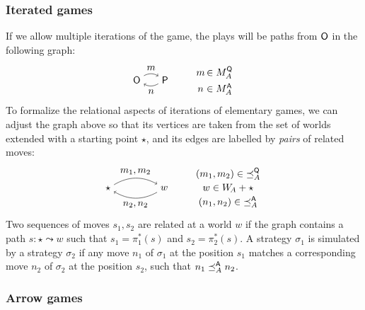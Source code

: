 \subsubsection{Iterated games}

If we allow multiple iterations of the game,
the plays will be paths from $ \mathsf{O} $ in the following graph:
\[
  \begin{tikzpicture}[baseline=(O.base)]
    \node (O) at (0,0) {\kw{O}};
    \node (P) at (1,0) {\kw{P}};
    \path [->] (O) edge[bend left] node[auto] {$m$} (P);
    \path [->] (P) edge[bend left] node[auto] {$n$} (O);
  \end{tikzpicture}
  \qquad
  \begin{array}{c@{\,}l}
    m &\in M_A^\kw{Q} \\[1ex]
    n &\in M_A^\kw{A}
  \end{array}
\]
To formalize the relational aspects of iterations
of elementary games,
we can adjust the graph above so that its vertices are taken
from the set of worlds extended with a starting point $\star$,
and its edges are labelled by \emph{pairs} of related moves:
\[
  \begin{tikzpicture}[baseline=(O.base)]
    \node (O) at (0,0) {$\star$};
    \node (P) at (2,0) {$w$};
    \path [->] (O) edge[bend left] node[auto] {$m_1, m_2$} (P);
    \path [->] (P) edge[bend left] node[auto] {$n_2, n_2$} (O);
  \end{tikzpicture}
  \qquad
  \begin{array}{c}
    (m_1, m_2) \in {\preceq}_A^\kw{Q} \\[.5ex]
    w \in W_{\!A} + \star \\[.5ex]
    (n_1, n_2) \in {\preceq}_A^\kw{A}
  \end{array}
\]
Two sequences of moves $s_1, s_2$
are related at a world $w$
if the graph contains a path $s : \star \leadsto w$
such that $s_1 = \pi_1^*(s)$ and $s_2 = \pi_2^*(s)$.
A strategy $\sigma_1$ is simulated by a strategy $\sigma_2$ if
any move $n_1$ of $\sigma_1$ at the position $s_1$
matches a corresponding move $n_2$ of $\sigma_2$ at the position $s_2$,
such that $n_1 \preceq_A^{ \mathsf{A} } n_2$.

\subsubsection{Arrow games}

